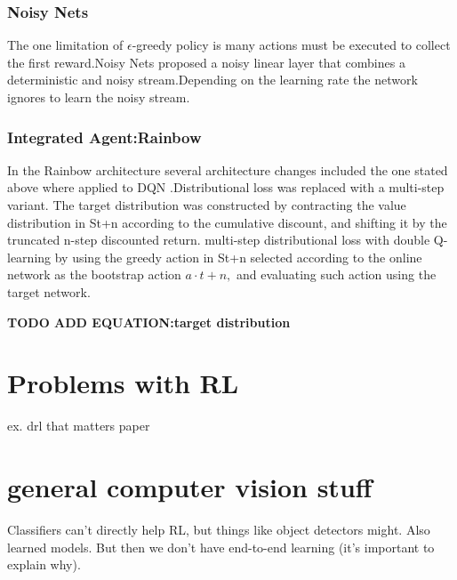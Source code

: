\subsubsection{Noisy Nets}

The one limitation of $\mathcal{\epsilon}$-greedy policy  is many actions must be executed to collect the first reward.Noisy Nets proposed a noisy linear layer that combines  a deterministic and noisy stream.Depending on the learning rate the network ignores to learn the noisy stream.

\subsubsection{Integrated Agent:Rainbow}


In the Rainbow architecture \cite{raibow} 
several architecture changes included the one stated above where applied to DQN .Distributional loss  
was replaced with a multi-step variant. The target distribution was constructed  by contracting the value distribution
in St+n according to the cumulative discount, 
and shifting it by the truncated n-step discounted return. 
multi-step distributional loss with double Q-learning by using the greedy action in St+n 
selected according to the online network as the bootstrap action $a \cdot t+n,$ and evaluating such action using the target network.

\textbf{TODO ADD EQUATION:target distribution}

\section{Problems with RL}
ex. drl that matters paper
\cite{drlthatmatters}

\section{general computer vision stuff}
Classifiers can't directly help RL, but things like object detectors might.
Also learned models.
But then we don't have end-to-end learning (it's important to explain why).

